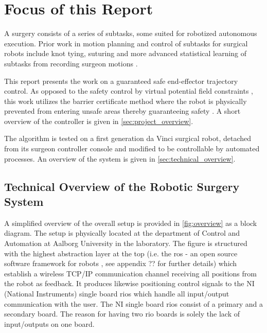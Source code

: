 \section{Focus of this Report}
A surgery consists of a series of subtasks, some suited for robotized autonomous execution. Prior work in motion planning and control of subtasks for surgical robots include knot tying, suturing and more advanced statistical learning of subtasks from recording surgeon motions \citep{bib:raven_debride,bib:raven_observ}.

This report presents the work on a guaranteed safe end-effector trajectory control. As opposed to the safety control by virtual potential field constraints \citep{bib:dlr_miro}, this work utilizes the barrier certificate method where the robot is physically prevented from entering unsafe areas thereby guaranteeing safety \citep{bib:safety}. A short overview of the controller is given in \autoref{sec:project_overview}.

The algorithm is tested on a first generation da Vinci surgical robot, detached from its surgeon controller console and modified to be controllable by automated processes. An overview of the system is given in \autoref{sec:technical_overview}.





\subsection{Technical Overview of the Robotic Surgery System}\label{sec:technical_overview}
A simplified overview of the overall setup is provided in \autoref{fig:overview} as a block diagram. The setup is physically located at the department of Control and Automation at Aalborg University in the laboratory. The figure is structured with the highest abstraction layer at the top (i.e. the \gls{ros} - an open source software framework for robots \citep{bib:ros}, see appendix ?? for further details) which establish a wireless TCP/IP communication channel receiving all positions from the robot as feedback. It produces likewise positioning control signals to the NI (National Instruments) single board \glspl{rio} which handle all input/output communication with the user. The NI single board \glspl{rio} consist of a primary and a secondary board. The reason for having two \gls{rio} boards is solely the lack of input/outputs on one board.


